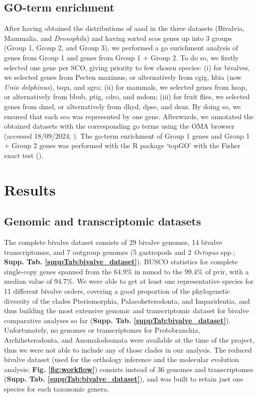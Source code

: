 \documentclass[../main.tex]{subfiles}
\begin{document}
\subsection{GO-term enrichment}
After having obtained the distributions of \gls{aasd} in the three datasets (Bivalvia, Mammalia, and \textit{Drosophila}) and having sorted \glspl{sco} genes up into 3 groups (Group 1, Group 2, and Group 3), we performed a \gls{go} enrichment analysis of genes from Group 1 and genes from Group 1 + Group 2. To do so, we firstly selected one gene per SCO, giving priority to few chosen species: (i) for bivalves, we selected genes from Pecten maximus, or alternatively from \gls{cgig}, \gls{hbia} (now \textit{Unio delphinus}), \gls{tsqu}, and \gls{sgra}; (ii) for mammals, we selected genes from \gls{hsap}, or alternatively from \gls{bbub}, \gls{ptig}, \gls{cdro}, and \gls{mdom}; (iii) for fruit flies, we selected genes from \gls{dmel}, or alternatively from \gls{dhyd}, \gls{dpse}, and \gls{dsuz}. By doing so, we ensured that each \gls{sco} was represented by one gene. Afterwards, we annotated the obtained datasets with the corresponding \gls{go} terms using the OMA browser (accessed 18/09/2024; \textbf{\cite{altenhoff2024oma}}). The \gls{go}-term enrichment of Group 1 genes and Group 1 + Group 2 genes was performed with the R package ‘topGO’ with the Fisher exact test (\textbf{\cite{alexa2009gene}}).

\section{Results} \label{chapter3_results}
\subsection{Genomic and transcriptomic datasets}
The complete bivalve dataset consists of 29 bivalve genomes, 14 bivalve transcriptomes, and 7 outgroup genomes (5 gastropods and 2 \textit{Octopus} spp.; \textbf{Supp. Tab. \ref{suppTab:bivalve_dataset}}). BUSCO statistics for complete single-copy genes spanned from the 64.9\% in \gls{mmod} to the 99.4\% of \gls{pvir}, with a median value of 94.7\%. We were able to get at least one representative species for 11 different bivalve orders, covering a good proportion of the phylogenetic diversity of the clades Pteriomorphia, Palaeoheterodonta, and Imparidentia, and thus building the most extensive genomic and transcriptomic dataset for bivalve comparative analyses so far (\textbf{Supp. Tab. \ref{suppTab:bivalve_dataset}}). Unfortunately, no genomes or transcriptomes for Protobranchia, Archiheterodonta, and Anomalodesmata were available at the time of the project, thus we were not able to include any of those clades in our analysis. The reduced bivalve dataset (used for the orthology inference and the molecular evolution analysis; \textbf{Fig. \ref{fig:workflow}}) consists instead of 36 genomes and transcriptomes (\textbf{Supp. Tab. \ref{suppTab:bivalve_dataset}}), and was built to retain just one species for each taxonomic genera.
\end{document}

